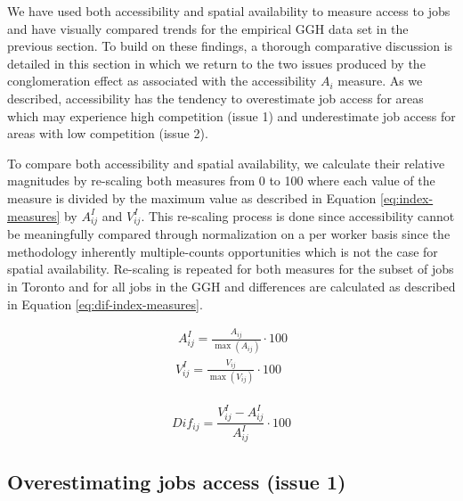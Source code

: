 \documentclass[]{elsarticle} %
\begin{document}
We have used both accessibility and spatial availability to measure
access to jobs and have visually compared trends for the empirical GGH
data set in the previous section. To build on these findings, a thorough
comparative discussion is detailed in this section in which we return to
the two issues produced by the conglomeration effect as associated with
the accessibility \(A_i\) measure. As we described, accessibility has
the tendency to overestimate job access for areas which may experience
high competition (issue 1) and underestimate job access for areas with
low competition (issue 2).

To compare both accessibility and spatial availability, we calculate
their relative magnitudes by re-scaling both measures from 0 to 100
where each value of the measure is divided by the maximum value as
described in Equation \ref{eq:index-measures} by \(A^I_{ij}\) and
\(V^I_{ij}\). This re-scaling process is done since accessibility cannot
be meaningfully compared through normalization on a per worker basis
since the methodology inherently multiple-counts opportunities which is
not the case for spatial availability. Re-scaling is repeated for both
measures for the subset of jobs in Toronto and for all jobs in the GGH
and differences are calculated as described in Equation
\ref{eq:dif-index-measures}.

\begin{equation}
\label{eq:index-measures}
\begin{array}{l}\
A^I_{ij} = \frac{A_{ij}}{\max(A_{ij})}\cdot100\\
V^I_{ij} = \frac{V_{ij}}{\max(V_{ij})}\cdot100\\
\end{array}
\end{equation}

\begin{equation}
\label{eq:dif-index-measures}
Dif_{ij} = \frac{V^I_{ij} - A^I_{ij}}{A^I_{ij}}\cdot100
\end{equation}

\hypertarget{overestimating-jobs-access-issue-1}{%
\subsection{Overestimating jobs access (issue
1)}\label{overestimating-jobs-access-issue-1}}
\end{document}
